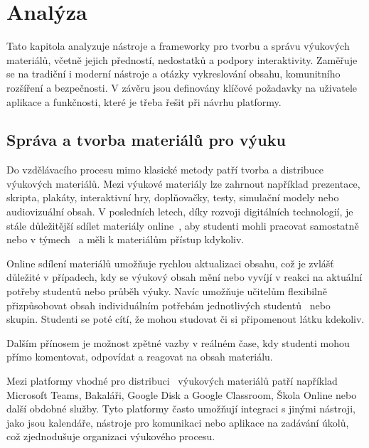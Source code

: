 \chapter{Analýza}\label{text:analyza}

\begin{chapterabstract}
Tato kapitola analyzuje nástroje a frameworky pro tvorbu a správu výukových materiálů, včetně jejich předností, nedostatků a podpory interaktivity. 
Zaměřuje se na tradiční i moderní nástroje a otázky vykreslování obsahu, komunitního rozšíření a bezpečnosti. 
V závěru jsou definovány klíčové požadavky na uživatele aplikace a funkčnosti, které je třeba řešit při návrhu platformy.
\end{chapterabstract}


\section{Správa a tvorba materiálů pro výuku}

Do vzdělávacího procesu mimo klasické metody patří tvorba a distribuce výukových materiálů.
Mezi výukové materiály lze zahrnout například prezentace, skripta, plakáty, interaktivní hry, doplňovačky, testy, simulační modely nebo audiovizuální obsah.
V posledních letech, díky rozvoji digitálních technologií, je stále důležitější sdílet materiály online~\cite{digikompetence}, aby studenti mohli pracovat samostatně nebo v týmech~\cite{kursch2019trendy} a měli k materiálům přístup kdykoliv.

Online sdílení materiálů umožňuje rychlou aktualizaci obsahu, což je zvlášť důležité v případech, kdy se výukový obsah mění nebo vyvíjí v reakci na aktuální potřeby studentů nebo průběh výuky.
Navíc umožňuje učitelům flexibilně přizpůsobovat obsah individuálním potřebám jednotlivých studentů~\cite{kursch2019trendy} nebo skupin.
Studenti se poté cítí, že mohou studovat či si připomenout látku kdekoliv.

Dalším přínosem je možnost zpětné vazby v reálném čase, kdy studenti mohou přímo komentovat, odpovídat a reagovat na obsah materiálu.

Mezi platformy vhodné pro distribuci~\cite{msmt_aplikace} výukových materiálů patří například Microsoft Teams, Bakaláři, Google Disk a Google Classroom, Škola Online nebo další obdobné služby.
Tyto platformy často umožňují integraci s jinými nástroji, jako jsou kalendáře, nástroje pro komunikaci nebo aplikace na zadávání úkolů, což zjednodušuje organizaci výukového procesu.

